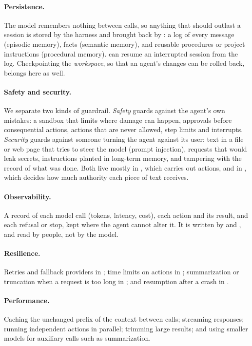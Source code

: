\paragraph{Persistence.} The model remembers nothing between calls, so anything that should outlast a session is stored by the harness and brought back by : a log of every message (episodic memory), facts (semantic memory), and reusable procedures or project instructions (procedural memory).  can resume an interrupted session from the log. Checkpointing the \emph{workspace}, so that an agent's changes can be rolled back, belongs here as well.

\paragraph{Safety and security.} We separate two kinds of guardrail. \emph{Safety} guards against the agent's own mistakes: a sandbox that limits where damage can happen, approvals before consequential actions, actions that are never allowed, step limits and interrupts. \emph{Security} guards against someone turning the agent against its user: text in a file or web page that tries to steer the model (prompt injection), requests that would leak secrets, instructions planted in long-term memory, and tampering with the record of what was done. Both live mostly in , which carries out actions, and in , which decides how much authority each piece of text receives.

\paragraph{Observability.} A record of each model call (tokens, latency, cost), each action and its result, and each refusal or stop, kept where the agent cannot alter it. It is written by  and , and read by people, not by the model.

\paragraph{Resilience.} Retries and fallback providers in ; time limits on actions in ; summarization or truncation when a request is too long in ; and resumption after a crash in .

\paragraph{Performance.} Caching the unchanged prefix of the context between calls; streaming responses; running independent actions in parallel; trimming large results; and using smaller models for auxiliary calls such as summarization.


